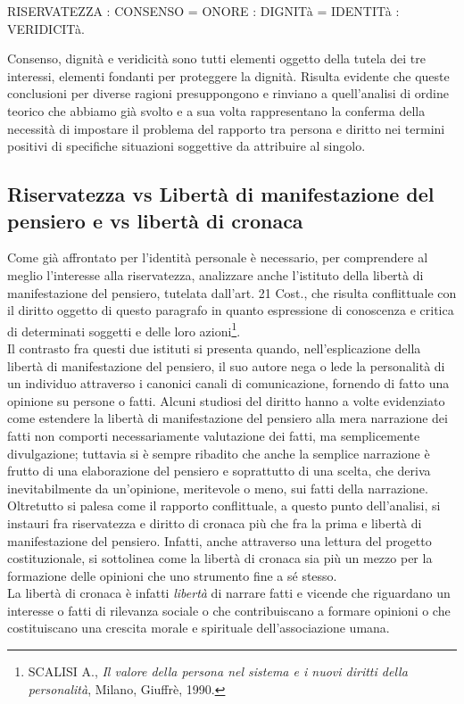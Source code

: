 RISERVATEZZA : CONSENSO = ONORE : DIGNITà = IDENTITà : VERIDICITà.

Consenso, dignità e veridicità sono tutti elementi oggetto della tutela dei tre interessi, elementi fondanti per proteggere la dignità.
Risulta evidente che queste conclusioni per diverse ragioni presuppongono e rinviano a quell'analisi di ordine teorico che abbiamo già svolto e a sua volta rappresentano la conferma della necessità di impostare il problema del rapporto tra persona e diritto nei termini positivi di specifiche situazioni soggettive da attribuire al singolo.


\subsection{Riservatezza vs Libertà di manifestazione del pensiero e vs libertà di cronaca}%
Come già affrontato per l'identità personale è necessario, per comprendere al meglio l'interesse alla riservatezza, analizzare anche l'istituto della libertà di manifestazione del pensiero, tutelata dall'art. 21 Cost., che risulta conflittuale con il diritto oggetto di questo paragrafo in quanto espressione di conoscenza e critica di determinati soggetti e delle loro azioni\footnote{SCALISI A., \textit{Il valore della persona nel sistema e i nuovi diritti della personalità}, Milano, Giuffrè, 1990.}.\\Il contrasto fra questi due istituti si presenta quando, nell'esplicazione della libertà di manifestazione del pensiero, il suo autore nega o lede la personalità di un individuo attraverso i canonici canali di comunicazione, fornendo di fatto una opinione su persone o fatti. Alcuni studiosi del diritto hanno a volte evidenziato come estendere la libertà di manifestazione del pensiero alla mera narrazione dei fatti non comporti necessariamente valutazione dei fatti, ma semplicemente divulgazione; tuttavia si è sempre ribadito che anche la semplice narrazione è frutto di una elaborazione del pensiero e soprattutto di una scelta, che deriva inevitabilmente da un'opinione, meritevole o meno, sui fatti della narrazione. Oltretutto si palesa come il rapporto conflittuale, a questo punto dell'analisi, si instauri fra riservatezza e diritto di cronaca più che fra la prima e libertà di manifestazione del pensiero.
Infatti, anche attraverso una lettura del progetto costituzionale, si sottolinea come la libertà di cronaca sia più un mezzo per la formazione delle opinioni che uno strumento fine a sé stesso.
\\La libertà di cronaca è infatti \textit{libertà} di narrare fatti e vicende che riguardano un interesse o fatti di rilevanza sociale o che contribuiscano a formare opinioni o che costituiscano una crescita morale e spirituale dell'associazione umana.
